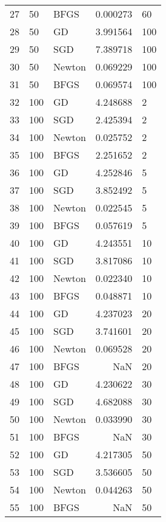 \begin{tabular}{lllrl}
27  &       50 &    BFGS &    0.000273 &     60 \\
28  &       50 &      GD &    3.991564 &    100 \\
29  &       50 &     SGD &    7.389718 &    100 \\
30  &       50 &  Newton &    0.069229 &    100 \\
31  &       50 &    BFGS &    0.069574 &    100 \\
32  &      100 &      GD &    4.248688 &      2 \\
33  &      100 &     SGD &    2.425394 &      2 \\
34  &      100 &  Newton &    0.025752 &      2 \\
35  &      100 &    BFGS &    2.251652 &      2 \\
36  &      100 &      GD &    4.252846 &      5 \\
37  &      100 &     SGD &    3.852492 &      5 \\
38  &      100 &  Newton &    0.022545 &      5 \\
39  &      100 &    BFGS &    0.057619 &      5 \\
40  &      100 &      GD &    4.243551 &     10 \\
41  &      100 &     SGD &    3.817086 &     10 \\
42  &      100 &  Newton &    0.022340 &     10 \\
43  &      100 &    BFGS &    0.048871 &     10 \\
44  &      100 &      GD &    4.237023 &     20 \\
45  &      100 &     SGD &    3.741601 &     20 \\
46  &      100 &  Newton &    0.069528 &     20 \\
47  &      100 &    BFGS &         NaN &     20 \\
48  &      100 &      GD &    4.230622 &     30 \\
49  &      100 &     SGD &    4.682088 &     30 \\
50  &      100 &  Newton &    0.033990 &     30 \\
51  &      100 &    BFGS &         NaN &     30 \\
52  &      100 &      GD &    4.217305 &     50 \\
53  &      100 &     SGD &    3.536605 &     50 \\
54  &      100 &  Newton &    0.044263 &     50 \\
55  &      100 &    BFGS &         NaN &     50 \\

\end{tabular}
